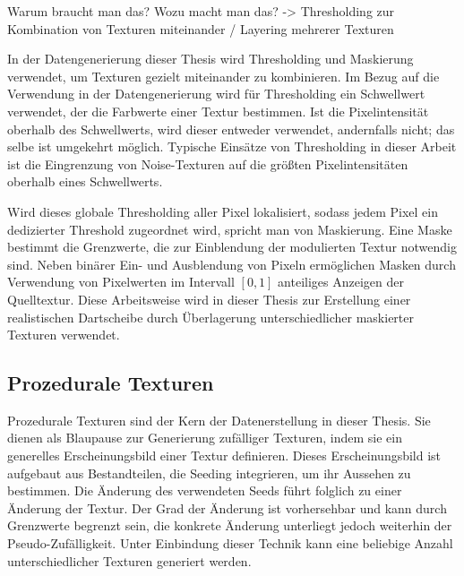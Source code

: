 Warum braucht man das? Wozu macht man das? -> Thresholding zur Kombination von Texturen miteinander / Layering mehrerer Texturen

In der Datengenerierung dieser Thesis wird Thresholding und Maskierung verwendet, um Texturen gezielt miteinander zu kombinieren. Im Bezug auf die Verwendung in der Datengenerierung wird  für Thresholding ein Schwellwert verwendet, der die Farbwerte einer Textur bestimmen. Ist die Pixelintensität oberhalb des Schwellwerts, wird dieser entweder verwendet, andernfalls nicht; das selbe ist umgekehrt möglich. Typische Einsätze von Thresholding in dieser Arbeit ist die Eingrenzung von Noise-Texturen auf die größten Pixelintensitäten oberhalb eines Schwellwerts.

Wird dieses globale Thresholding aller Pixel lokalisiert, sodass jedem Pixel ein dedizierter Threshold zugeordnet wird, spricht man von Maskierung. Eine Maske bestimmt die Grenzwerte, die zur Einblendung der modulierten Textur notwendig sind. Neben binärer Ein- und Ausblendung von Pixeln ermöglichen Masken durch Verwendung von Pixelwerten im Intervall $[0, 1]$ anteiliges Anzeigen der Quelltextur. Diese Arbeitsweise wird in dieser Thesis zur Erstellung einer realistischen Dartscheibe durch Überlagerung unterschiedlicher maskierter Texturen verwendet.



\subsection{Prozedurale Texturen}
\label{sec:was_prozedurale_texturen}

Prozedurale Texturen sind der Kern der Datenerstellung in dieser Thesis. Sie dienen als Blaupause zur Generierung zufälliger Texturen, indem sie ein generelles Erscheinungsbild einer Textur definieren. Dieses Erscheinungsbild ist aufgebaut aus Bestandteilen, die Seeding integrieren, um ihr Aussehen zu bestimmen. Die Änderung des verwendeten Seeds führt folglich zu einer Änderung der Textur. Der Grad der Änderung ist vorhersehbar und kann durch Grenzwerte begrenzt sein, die konkrete Änderung unterliegt jedoch weiterhin der Pseudo-Zufälligkeit. Unter Einbindung dieser Technik kann eine beliebige Anzahl unterschiedlicher Texturen generiert werden.
